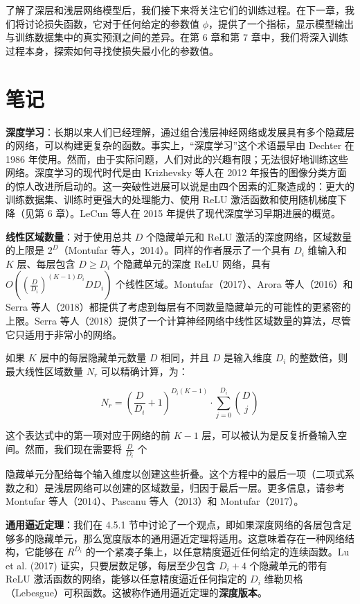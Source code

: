 \documentclass[lang=cn,newtx,10pt,scheme=chinese]{elegantbook}
\begin{document}
了解了深层和浅层网络模型后，我们接下来将关注它们的训练过程。在下一章，我们将讨论损失函数，它对于任何给定的参数值 \(\phi\)，提供了一个指标，显示模型输出与训练数据集中的真实预测之间的差异。在第 6 章和第 7 章中，我们将深入训练过程本身，探索如何寻找使损失最小化的参数值。


\section{笔记}

\textbf{深度学习}：长期以来人们已经理解，通过组合浅层神经网络或发展具有多个隐藏层的网络，可以构建更复杂的函数。事实上，“深度学习”这个术语最早由 Dechter 在 1986 年使用。然而，由于实际问题，人们对此的兴趣有限；无法很好地训练这些网络。深度学习的现代时代是由 Krizhevsky 等人在 2012 年报告的图像分类方面的惊人改进所启动的。这一突破性进展可以说是由四个因素的汇聚造成的：更大的训练数据集、训练时更强大的处理能力、使用 ReLU 激活函数和使用随机梯度下降（见第 6 章）。LeCun 等人在 2015 年提供了现代深度学习早期进展的概览。

\textbf{线性区域数量}：对于使用总共 \(D\) 个隐藏单元和 ReLU 激活的深度网络，区域数量的上限是 \(2^D\)（Montufar 等人，2014）。同样的作者展示了一个具有 \(D_i\) 维输入和 \(K\) 层、每层包含 \(D \geq D_i\) 个隐藏单元的深度 ReLU 网络，具有 \(O\left(\left(\frac{D}{D_i}\right)^{(K-1)D_i}D D_i\right)\) 个线性区域。Montufar（2017）、Arora 等人（2016）和 Serra 等人（2018）都提供了考虑到每层有不同数量隐藏单元的可能性的更紧密的上限。Serra 等人（2018）提供了一个计算神经网络中线性区域数量的算法，尽管它只适用于非常小的网络。

如果 \(K\) 层中的每层隐藏单元数量 \(D\) 相同，并且 \(D\) 是输入维度 \(D_i\) 的整数倍，则最大线性区域数量 \(N_r\) 可以精确计算，为：

\begin{equation}
N_r = \left( \frac{D}{D_i} + 1 \right)^{D_i(K-1)} \cdot \sum_{j=0}^{D_i} \binom{D}{j} 
\end{equation}

这个表达式中的第一项对应于网络的前 \(K - 1\) 层，可以被认为是反复折叠输入空间。然而，我们现在需要将 \(\frac{D}{D_i}\) 个

隐藏单元分配给每个输入维度以创建这些折叠。这个方程中的最后一项（二项式系数之和）是浅层网络可以创建的区域数量，归因于最后一层。更多信息，请参考 Montufar 等人（2014）、Pascanu 等人（2013）和 Montufar（2017）。

\textbf{通用逼近定理}：我们在 4.5.1 节中讨论了一个观点，即如果深度网络的各层包含足够多的隐藏单元，那么宽度版本的通用逼近定理将适用。这意味着存在一种网络结构，它能够在 \(R^{D_i}\) 的一个紧凑子集上，以任意精度逼近任何给定的连续函数。Lu et al. (2017) 证实，只要层数足够，每层至少包含 \(D_i + 4\) 个隐藏单元的带有 ReLU 激活函数的网络，能够以任意精度逼近任何指定的 \(D_i\) 维勒贝格（Lebesgue）可积函数。这被称作通用逼近定理的\textbf{深度版本}。
\end{document}
